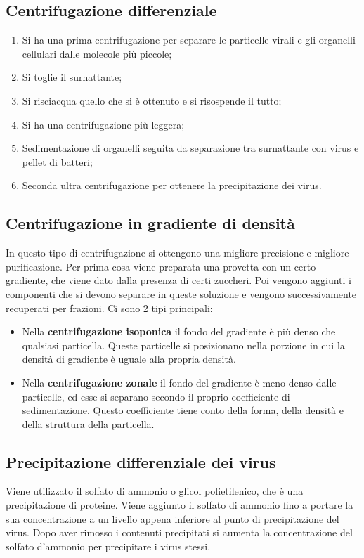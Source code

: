 \subsection{Centrifugazione differenziale}
\begin{enumerate}
    \item Si ha una prima centrifugazione per separare le particelle virali e gli organelli cellulari dalle molecole più piccole; 
    \item Si toglie il surnattante; 
    \item Si risciacqua quello che si è ottenuto e si risospende il tutto;
    \item Si ha una centrifugazione più leggera; \item Sedimentazione di organelli seguita da separazione tra surnattante con virus e pellet di batteri;
    \item Seconda ultra centrifugazione per ottenere la precipitazione dei virus. 
\end{enumerate}
\subsection{Centrifugazione in gradiente di densità}
In questo tipo di centrifugazione si ottengono una migliore precisione e migliore purificazione. Per prima cosa viene preparata una provetta con un certo gradiente, che viene dato dalla presenza di certi zuccheri. Poi vengono aggiunti i componenti che si devono separare in queste soluzione e vengono successivamente recuperati per frazioni. Ci sono 2 tipi principali: 
\begin{itemize}
    \item Nella \textbf{centrifugazione isoponica} il fondo del gradiente è più denso che qualsiasi particella. Queste particelle si posizionano nella porzione in cui la densità di gradiente è uguale alla propria densità.
    \item Nella \textbf{centrifugazione zonale} il fondo del gradiente è meno denso dalle particelle, ed esse si separano secondo il proprio coefficiente di sedimentazione. Questo coefficiente tiene conto della forma, della densità e della struttura della particella. 
\end{itemize}
\subsection{Precipitazione differenziale dei virus}
Viene utilizzato il solfato di ammonio o glicol polietilenico, che è una precipitazione di proteine. Viene aggiunto il solfato di ammonio fino a portare la sua concentrazione a un livello appena inferiore al punto di precipitazione del virus. Dopo aver rimosso i contenuti precipitati si aumenta la concentrazione del solfato d'ammonio per precipitare i virus stessi. 

